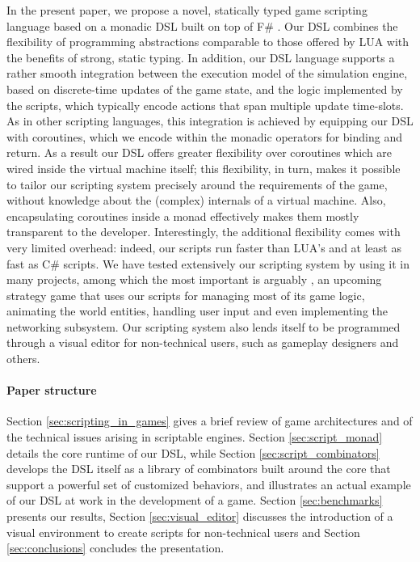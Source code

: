 In the present paper, we propose a novel, statically typed game
scripting language based on a monadic DSL \cite{MONADIC_DSL} built 
on top of F\# \cite{FRIENDLY_FSHARP}. Our DSL combines the flexibility of programming
abstractions comparable to those offered  by LUA with the benefits of
strong, static typing. In addition, our DSL language supports a rather
smooth integration between the execution model of the simulation
engine, based on discrete-time updates of the game state, and the
logic implemented  by the scripts, which typically encode actions that
span multiple update time-slots. As in other scripting languages, this
integration   is achieved by equipping our DSL with coroutines, which
we encode  within the monadic operators for binding and return. As a
result our DSL offers greater flexibility over coroutines which 
are wired inside the virtual machine itself; this flexibility, 
in turn, makes it possible to tailor our scripting system precisely
around the requirements of the game, without knowledge about the (complex)
internals of a virtual machine. Also, encapsulating coroutines inside
a monad effectively makes them mostly transparent to the developer.
Interestingly, the additional flexibility comes with very limited
overhead: indeed, our scripts run faster than LUA's and at least as
fast as C\# scripts. We have tested extensively our scripting system by
using it in many projects, among which the most important is arguably
\cite{GALAXY_WARS}, an upcoming strategy game that uses our scripts for
managing most of its game logic, animating the world entities, handling
user input and even implementing the networking subsystem. Our scripting 
system also lends itself to be programmed through a visual editor for
non-technical users, such as gameplay designers and others.

\paragraph{Paper structure} Section \ref{sec:scripting_in_games} gives a
brief review of game architectures and of the technical issues arising
in scriptable engines. Section \ref{sec:script_monad} details the core 
runtime of our DSL, while Section \ref{sec:script_combinators}
develops the DSL itself as a library of combinators built
around the core that support a powerful set of customized behaviors,
and illustrates an actual example of our DSL at work in the
development of a game. Section \ref{sec:benchmarks} presents our
results, Section \ref{sec:visual_editor} discusses the introduction of a 
visual environment to create scripts for non-technical users and Section 
\ref{sec:conclusions} concludes the presentation.    





